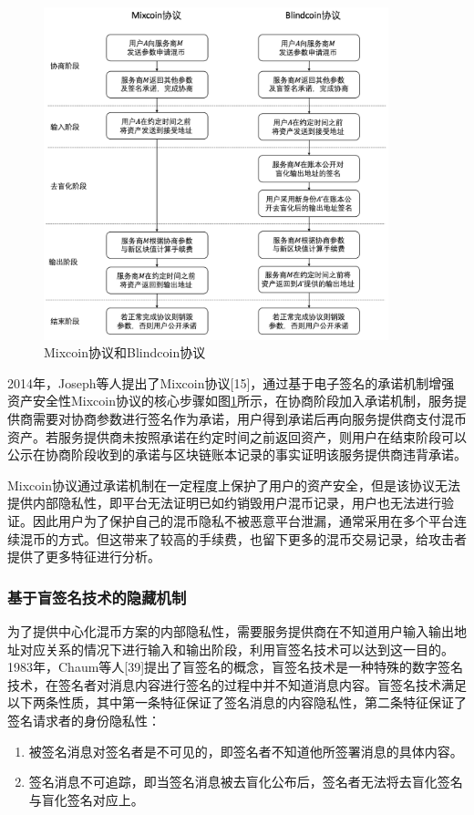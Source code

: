 \begin{figure}
\centering
\includegraphics[width=10cm]{figures/mixcoin-blindcoin.png}
\caption{Mixcoin协议和Blindcoin协议}
\label{fig:mixcoin-blindcoin}
\end{figure}

2014年，Joseph等人提出了Mixcoin协议[15]，通过基于电子签名的承诺机制增强资产安全性Mixcoin协议的核心步骤如图\ref{fig:mixcoin-blindcoin}所示，在协商阶段加入承诺机制，服务提供商需要对协商参数进行签名作为承诺，用户得到承诺后再向服务提供商支付混币资产。若服务提供商未按照承诺在约定时间之前返回资产，则用户在结束阶段可以公示在协商阶段收到的承诺与区块链账本记录的事实证明该服务提供商违背承诺。
	
Mixcoin协议通过承诺机制在一定程度上保护了用户的资产安全，但是该协议无法提供内部隐私性，即平台无法证明已如约销毁用户混币记录，用户也无法进行验证。因此用户为了保护自己的混币隐私不被恶意平台泄漏，通常采用在多个平台连续混币的方式。但这带来了较高的手续费，也留下更多的混币交易记录，给攻击者提供了更多特征进行分析。

\subsubsection{基于盲签名技术的隐藏机制}
为了提供中心化混币方案的内部隐私性，需要服务提供商在不知道用户输入输出地址对应关系的情况下进行输入和输出阶段，利用盲签名技术可以达到这一目的。1983年，Chaum等人[39]提出了盲签名的概念，盲签名技术是一种特殊的数字签名技术，在签名者对消息内容进行签名的过程中并不知道消息内容。盲签名技术满足以下两条性质，其中第一条特征保证了签名消息的内容隐私性，第二条特征保证了签名请求者的身份隐私性：
\begin{enumerate}
	\item 被签名消息对签名者是不可见的，即签名者不知道他所签署消息的具体内容。
	\item 签名消息不可追踪，即当签名消息被去盲化公布后，签名者无法将去盲化签名与盲化签名对应上。
\end{enumerate}

